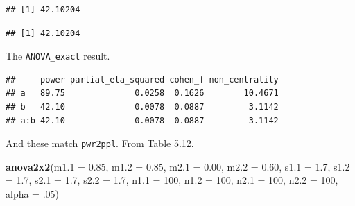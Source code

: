 \documentclass[]{book}
\newenvironment{Shaded}{\begin{snugshade}}{\end{snugshade}}
\newcommand{\DataTypeTok}[1]{\textcolor[rgb]{0.13,0.29,0.53}{#1}}
\newcommand{\DecValTok}[1]{\textcolor[rgb]{0.00,0.00,0.81}{#1}}
\newcommand{\FloatTok}[1]{\textcolor[rgb]{0.00,0.00,0.81}{#1}}
\newcommand{\KeywordTok}[1]{\textcolor[rgb]{0.13,0.29,0.53}{\textbf{#1}}}
\newcommand{\NormalTok}[1]{#1}
\newcommand{\OperatorTok}[1]{\textcolor[rgb]{0.81,0.36,0.00}{\textbf{#1}}}
\newcommand{\OtherTok}[1]{\textcolor[rgb]{0.56,0.35,0.01}{#1}}
\newcommand{\StringTok}[1]{\textcolor[rgb]{0.31,0.60,0.02}{#1}}
\begin{document}
\begin{Shaded}
\end{Shaded}

\begin{verbatim}
## [1] 42.10204
\end{verbatim}

\begin{Shaded}
\end{Shaded}

\begin{verbatim}
## [1] 42.10204
\end{verbatim}

The \texttt{ANOVA\_exact} result.

\begin{Shaded}
\end{Shaded}

\begin{verbatim}
##     power partial_eta_squared cohen_f non_centrality
## a   89.75              0.0258  0.1626        10.4671
## b   42.10              0.0078  0.0887         3.1142
## a:b 42.10              0.0078  0.0887         3.1142
\end{verbatim}

And these match \texttt{pwr2ppl}. From Table 5.12.

\begin{Shaded}
\begin{Highlighting}[]
\KeywordTok{anova2x2}\NormalTok{(}\DataTypeTok{m1.1 =} \FloatTok{0.85}\NormalTok{, }\DataTypeTok{m1.2 =} \FloatTok{0.85}\NormalTok{, }\DataTypeTok{m2.1 =} \FloatTok{0.00}\NormalTok{, }\DataTypeTok{m2.2 =} \FloatTok{0.60}\NormalTok{,}
         \DataTypeTok{s1.1 =} \FloatTok{1.7}\NormalTok{, }\DataTypeTok{s1.2 =} \FloatTok{1.7}\NormalTok{, }\DataTypeTok{s2.1 =} \FloatTok{1.7}\NormalTok{, }\DataTypeTok{s2.2 =} \FloatTok{1.7}\NormalTok{,}
         \DataTypeTok{n1.1 =} \DecValTok{100}\NormalTok{, }\DataTypeTok{n1.2 =} \DecValTok{100}\NormalTok{, }\DataTypeTok{n2.1 =} \DecValTok{100}\NormalTok{, }\DataTypeTok{n2.2 =} \DecValTok{100}\NormalTok{,}
         \DataTypeTok{alpha =} \FloatTok{.05}\NormalTok{)}
\end{Highlighting}
\end{Shaded}
\end{document}
